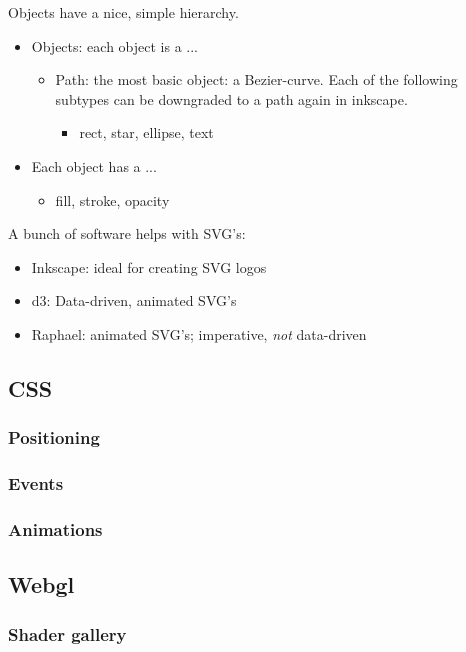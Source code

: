 Objects have a nice, simple hierarchy.
\begin{itemize}
    \item Objects: each object is a ...
        \begin{itemize}
            \item Path: the most basic object: a Bezier-curve. Each of the following subtypes can be downgraded to a path again in inkscape.
                \begin{itemize}
                    \item rect, star, ellipse, text
                \end{itemize}
        \end{itemize}
    \item Each object has a ... 
        \begin{itemize}
            \item fill, stroke, opacity
        \end{itemize}
\end{itemize}

A bunch of software helps with SVG's:
\begin{itemize}
    \item Inkscape: ideal for creating SVG logos
    \item d3: Data-driven, animated SVG's
    \item Raphael: animated SVG's; imperative, \emph{not} data-driven
\end{itemize}



\subsection{CSS}

\subsubsection{Positioning}
\subsubsection{Events}
\subsubsection{Animations}



\subsection{Webgl}


\subsubsection{Shader gallery}


